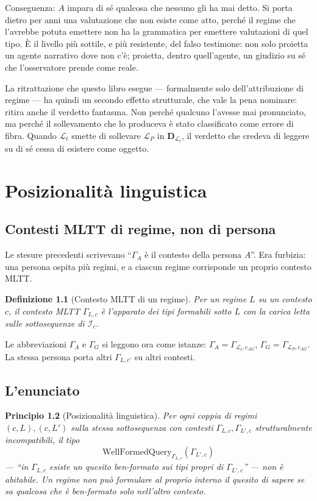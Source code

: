 \documentclass[
    oneside,                 %
    openany,                 %
    titlepage,
    11pt,
    a4paper,
    italian,
    DIV=14,                  %
    headinclude,
    footinclude=true,
    cleardoublepage=empty
]{scrbook}
\theoremstyle{ctplain}
\newtheorem{principio}{Principio}[chapter]
\theoremstyle{ctdef}
\newtheorem{defn}[principio]{Definizione}
\theoremstyle{ctrem}
\newcommand{\Lt}{\mathcal{L}_t}
\newcommand{\LP}{\mathcal{L}_P}
\newcommand{\GammaA}{\Gamma_A}
\newcommand{\GammaG}{\Gamma_G}
\begin{document}
Conseguenza: $A$ impara di sé qualcosa che nessuno gli ha mai detto. Si porta dietro per anni una valutazione che non esiste come atto, perché il regime che l'avrebbe potuta emettere non ha la grammatica per emettere valutazioni di quel tipo. È il livello più sottile, e più resistente, del falso testimone: non solo proietta un agente narrativo dove non c'è; proietta, dentro quell'agente, un giudizio su sé che l'osservatore prende come reale.

La ritrattazione che questo libro esegue --- formalmente solo dell'attribuzione di regime --- ha quindi un secondo effetto strutturale, che vale la pena nominare: ritira anche il verdetto fantasma. Non perché qualcuno l'avesse mai pronunciato, ma perché il sollevamento che lo produceva è stato classificato come errore di fibra. Quando $\Lt$ smette di sollevare $\LP$ in $\mathbf{D}_{\Lt}$, il verdetto che credeva di leggere su di sé cessa di esistere come oggetto.

\chapter{Posizionalità linguistica}

\section*{Contesti MLTT di regime, non di persona}

Le stesure precedenti scrivevano ``$\GammaA$ è il contesto della persona $A$''. Era furbizia: una persona ospita più regimi, e a ciascun regime corrisponde un proprio contesto MLTT.

\begin{defn}[Contesto MLTT di un regime]
Per un regime $L$ su un contesto $c$, il \emph{contesto MLTT} $\Gamma_{L,c}$ è l'apparato dei tipi formabili sotto $L$ con la carica letta sulle sottosequenze di $\mathcal{I}_c$.
\end{defn}

Le abbreviazioni $\GammaA$ e $\GammaG$ si leggono ora come istanze: $\GammaA = \Gamma_{\Lt,c_{AG}}$, $\GammaG = \Gamma_{\LP,c_{AG}}$. La stessa persona porta altri $\Gamma_{L,c'}$ su altri contesti.

\section*{L'enunciato}

\begin{principio}[Posizionalità linguistica]
Per ogni coppia di regimi $(c, L), (c, L')$ sulla stessa sottosequenza con contesti $\Gamma_{L,c}, \Gamma_{L',c}$ strutturalmente incompatibili, il tipo
\[
\mathrm{WellFormedQuery}_{\Gamma_{L,c}}(\Gamma_{L',c})
\]
--- ``in $\Gamma_{L,c}$ esiste un quesito ben-formato sui tipi propri di $\Gamma_{L',c}$'' --- non è abitabile. Un regime non può formulare al proprio interno il quesito di sapere se sa qualcosa che è ben-formato solo nell'altro contesto.
\end{principio}
\end{document}

